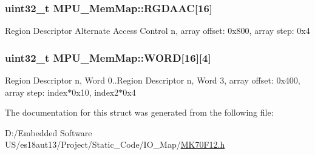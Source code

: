 \subsubsection[{R\+G\+D\+A\+A\+C}]{\setlength{\rightskip}{0pt plus 5cm}uint32\+\_\+t M\+P\+U\+\_\+\+Mem\+Map\+::\+R\+G\+D\+A\+A\+C\mbox{[}16\mbox{]}}\label{struct_m_p_u___mem_map_a7f9c813f610ff2ffa2027cec351b0b1f}
Region Descriptor Alternate Access Control n, array offset\+: 0x800, array step\+: 0x4 \hypertarget{struct_m_p_u___mem_map_ac0f1b1c2b2f2b70a90e02302add086f1}{}
\subsubsection[{W\+O\+R\+D}]{\setlength{\rightskip}{0pt plus 5cm}uint32\+\_\+t M\+P\+U\+\_\+\+Mem\+Map\+::\+W\+O\+R\+D\mbox{[}16\mbox{]}\mbox{[}4\mbox{]}}\label{struct_m_p_u___mem_map_ac0f1b1c2b2f2b70a90e02302add086f1}
Region Descriptor n, Word 0..Region Descriptor n, Word 3, array offset\+: 0x400, array step\+: index$\ast$0x10, index2$\ast$0x4 

The documentation for this struct was generated from the following file\+:\begin{DoxyCompactItemize}
\item 
D\+:/\+Embedded Software U\+S/es18aut13/\+Project/\+Static\+\_\+\+Code/\+I\+O\+\_\+\+Map/\hyperlink{_m_k70_f12_8h}{M\+K70\+F12.\+h}\end{DoxyCompactItemize}
